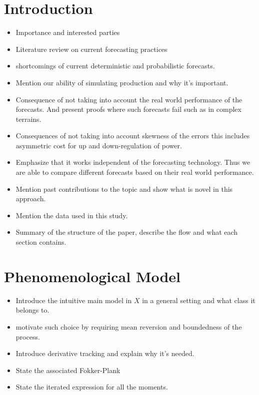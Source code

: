 \documentclass[10pt,twocolumn,letterpaper]{article}
\begin{document}
\section{Introduction}

\begin{itemize}
    \item Importance and interested parties
    \item Literature review on current forecasting practices
    \item shortcomings of current deterministic and probabilistic forecasts.
    \item Mention our ability of simulating production and why it's important.
    \item Consequence of not taking into account the real world performance of the forecasts. And present proofs where such forecasts fail such as in complex terrains.
    \item Consequences of not taking into account skewness of the errors this includes asymmetric cost for up and down-regulation of power.
    \item Emphasize that it works independent of the forecasting technology. Thus we are able to compare different forecasts based on their real world performance.
    \item Mention past contributions to the topic and show what is novel in this approach.
    \item Mention the data used in this study.
    \item Summary of the structure of the paper, describe the flow and what each section contains.
\end{itemize}


\section{Phenomenological  Model}

\begin{itemize}
    \item Introduce the intuitive main model in $X$ in a general setting and what class it belongs to.
    \item motivate such choice by requiring mean reversion and boundedness of the process.
    \item Introduce derivative tracking and explain why it's needed.
    \item State the associated Fokker-Plank
    \item State the iterated expression for all the moments.
\end{itemize}
\end{document}
